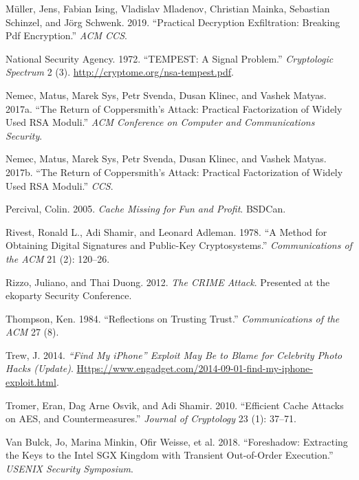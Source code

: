 \documentclass[
  letterpaper,
]{scrbook}
\newlength{\cslhangindent}
\newenvironment{CSLReferences}[2] %
 {\begin{list}{}{%
  \setlength{\itemindent}{0pt}
  \setlength{\leftmargin}{0pt}
  \setlength{\parsep}{0pt}
  \ifodd #1
   \setlength{\leftmargin}{\cslhangindent}
   \setlength{\itemindent}{-1\cslhangindent}
  \fi
  \setlength{\itemsep}{#2\baselineskip}}}
 {\end{list}}
\theoremstyle{definition}
\theoremstyle{plain}
\theoremstyle{plain}
\theoremstyle{remark}
\begin{document}
\begin{CSLReferences}{1}{1}
Müller, Jens, Fabian Ising, Vladislav Mladenov, Christian Mainka,
Sebastian Schinzel, and Jörg Schwenk. 2019. {``Practical Decryption
Exfiltration: Breaking Pdf Encryption.''} \emph{ACM CCS}.

National Security Agency. 1972. {``{TEMPEST}: A Signal Problem.''}
\emph{Cryptologic Spectrum} 2 (3).
\url{http://cryptome.org/nsa-tempest.pdf}.

Nemec, Matus, Marek Sys, Petr Svenda, Dusan Klinec, and Vashek Matyas.
2017a. {``The Return of {Coppersmith's} Attack: Practical Factorization
of Widely Used {RSA} Moduli.''} \emph{ACM Conference on Computer and
Communications Security}.

Nemec, Matus, Marek Sys, Petr Svenda, Dusan Klinec, and Vashek Matyas.
2017b. {``The Return of {Coppersmith's} Attack: Practical Factorization
of Widely Used {RSA} Moduli.''} \emph{CCS}.

Percival, Colin. 2005. \emph{Cache Missing for Fun and Profit}. BSDCan.

Rivest, Ronald L., Adi Shamir, and Leonard Adleman. 1978. {``A Method
for Obtaining Digital Signatures and Public-Key Cryptosystems.''}
\emph{Communications of the ACM} 21 (2): 120--26.

Rizzo, Juliano, and Thai Duong. 2012. \emph{The {CRIME} Attack}.
Presented at the ekoparty Security Conference.

Thompson, Ken. 1984. {``Reflections on Trusting Trust.''}
\emph{Communications of the ACM} 27 (8).

Trew, J. 2014. \emph{{``{Find My iPhone}''} Exploit May Be to Blame for
Celebrity Photo Hacks (Update)}.
\href{https://www.engadget.com/2014-09-01-find-my-iphone-exploit.html}{Https://www.engadget.com/2014-09-01-find-my-iphone-exploit.html}.

Tromer, Eran, Dag Arne Osvik, and Adi Shamir. 2010. {``Efficient Cache
Attacks on {AES}, and Countermeasures.''} \emph{Journal of Cryptology}
23 (1): 37--71.

Van Bulck, Jo, Marina Minkin, Ofir Weisse, et al. 2018. {``Foreshadow:
Extracting the Keys to the {Intel SGX} Kingdom with Transient
Out-of-Order Execution.''} \emph{USENIX Security Symposium}.


\end{CSLReferences}
\end{document}
